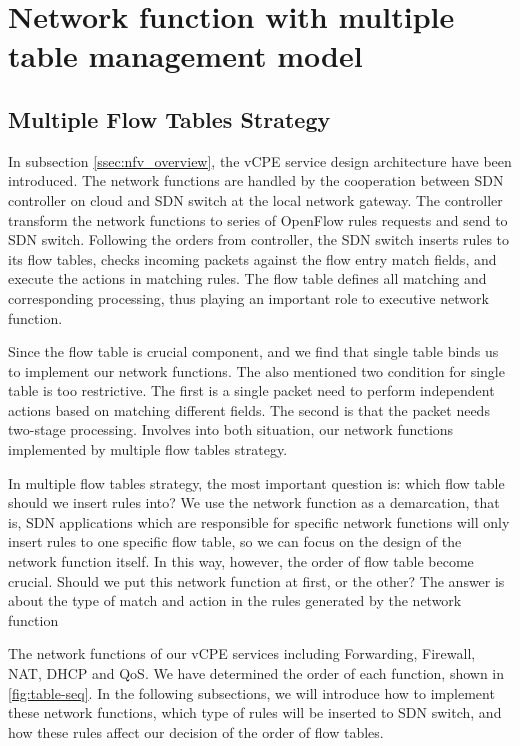 \documentclass[journal]{IEEEtran}
\begin{document}
\section{Network function with multiple table management model}\label{sec:nf_mft}
\subsection{Multiple Flow Tables Strategy}
In subsection \ref{ssec:nfv_overview}, the vCPE service design architecture have been introduced. The network functions are handled by the cooperation between SDN controller on cloud and SDN switch at the local network gateway. The controller transform the network functions to series of OpenFlow rules requests and send to SDN switch. Following the orders from controller, the SDN switch inserts rules to its flow tables, checks incoming packets against the flow entry match fields, and execute the actions in matching rules. The flow table defines all matching and corresponding processing, thus playing an important role to executive network function.

Since the flow table is crucial component, and we find that single table binds us to implement our network functions. The \cite{onf-multi-tables} also mentioned two condition for single table is too restrictive. The first is a single packet need to perform independent actions based on matching different fields. The second is that the packet needs two-stage processing. Involves into both situation, our network functions implemented by multiple flow tables strategy.

In multiple flow tables strategy, the most important question is: which flow table should we insert rules into? We use the network function as a demarcation, that is, SDN applications which are responsible for specific network functions will only insert rules to one specific flow table, so we can focus on the design of the network function itself. In this way, however, the order of flow table become crucial. Should we put this network function at first, or the other? The answer is about the type of match and action in the rules generated by the network function

The network functions of our vCPE services including Forwarding, Firewall, NAT, DHCP and QoS. We have determined the order of each function, shown in \ref{fig:table-seq}.  In the following subsections, we will introduce how to implement these network functions, which type of rules will be inserted to SDN switch, and how these rules affect our decision of the order of flow tables.
\end{document}
